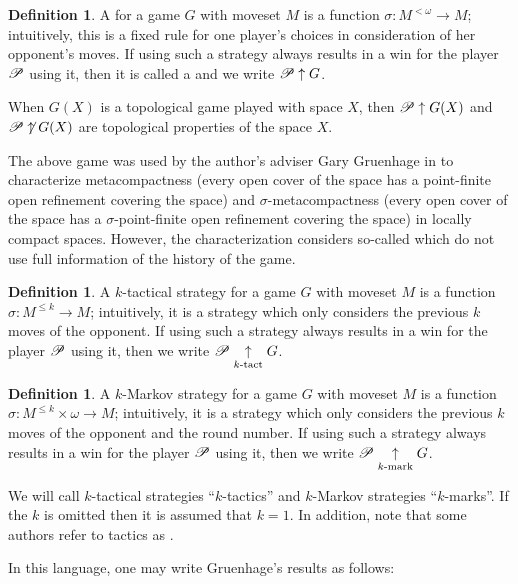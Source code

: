 \documentclass{amsart}
\theoremstyle{definition}
\newtheorem{definition}[theorem]{Definition}
\begin{document}
\begin{definition}
  A  for a game $G$ with moveset $M$ is a function
  $\sigma:M^{<\omega}\to M$; intuitively, this is a fixed rule for one player's
  choices in consideration of her opponent's moves. If using such a strategy
  always results in a win for the player $\mathscr{P}$ using it, then it is called a
   and we write $\mathscr{P}\uparrow G$.
\end{definition}

When $G(X)$ is a topological game played with space $X$, then $\mathscr{P}\uparrow G(X)$
and $\mathscr{P}\not\uparrow G(X)$ are topological properties of the space $X$.

The above game was used by the author's adviser Gary Gruenhage in
\cite{MR858337} to characterize
metacompactness (every open cover of the space has a point-finite open
refinement covering the space) and $\sigma$-metacompactness
(every open cover of the space has a $\sigma$-point-finite open refinement
covering the space) in locally compact spaces. However, the characterization
considers so-called  which do not use
full information of the history of the game.

\begin{definition}
  A $k$-tactical strategy for a game $G$ with moveset $M$ is a function
  $\sigma:M^{\leq k}\to M$; intuitively, it is a strategy which only considers
  the previous $k$ moves of the opponent. If using such a strategy
  always results in a win for the player $\mathscr{P}$ using it, then
  we write $\mathscr{P}\underset{k\text{-tact}}{\uparrow} G$.
\end{definition}

\begin{definition}
  A $k$-Markov strategy for a game $G$ with moveset $M$ is a function
  $\sigma:M^{\leq k}\times\omega\to M$; intuitively, it is a strategy which
  only considers the previous $k$ moves of the opponent and the round number.
  If using such a strategy
  always results in a win for the player $\mathscr{P}$ using it, then
  we write $\mathscr{P}\underset{k\text{-mark}}{\uparrow} G$.
\end{definition}

We will call $k$-tactical strategies ``$k$-tactics'' and $k$-Markov strategies
``$k$-marks''. If the $k$ is omitted then it is assumed that $k=1$. In
addition, note that some authors refer to tactics as
.

In this language, one may write Gruenhage's results as follows:
\end{document}
